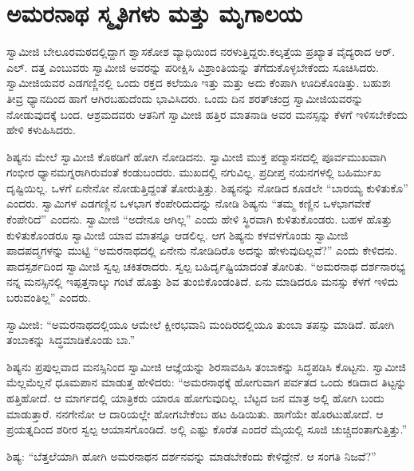 
\chapter{ಅಮರನಾಥ ಸ್ಮೃತಿಗಳು ಮತ್ತು ಮೃಗಾಲಯ }

 ಸ್ವಾಮೀಜಿ ಬೇಲೂರಮಠದಲ್ಲಿದ್ದಾಗ ಶ್ವಾಸಕೋಶ ವ್ಯಾಧಿಯಿಂದ ನರಳುತ್ತಿದ್ದರು.\break ಕಲ್ಕತ್ತೆಯ ಪ್ರಖ್ಯಾತ ವೈದ್ಯರಾದ ಆರ್. ಎಲ್. ದತ್ತ ಎಂಬುವರು ಸ್ವಾಮೀಜಿ ಅವರನ್ನು ಪರೀಕ್ಷಿಸಿ ವಿಶ್ರಾಂತಿಯನ್ನು ತೆಗೆದುಕೊಳ್ಳಬೇಕೆಂದು ಸೂಚಿಸಿದರು. ಸ್ವಾಮೀಜಿಯವರ ಎಡಗಣ್ಣಿನಲ್ಲಿ ಒಂದು ರಕ್ತದ ಕಲೆಯೂ ಇತ್ತು ಮತ್ತು ಅದು ಕೆಂಪಾಗಿ ಊದಿಕೊಂಡಿತ್ತು. ಬಹುಶಃ ತೀವ್ರ ಧ್ಯಾನದಿಂದ ಹಾಗೆ ಆಗಿರಬಹುದೆಂದು ಭಾವಿಸಿದರು. ಒಂದು ದಿನ ಶರತ್‍ಚಂದ್ರ ಸ್ವಾಮೀಜಿಯವರನ್ನು ನೋಡುವುದಕ್ಕೆ ಬಂದ. ಆಶ್ರಮದವರು ಆತನಿಗೆ ಸ್ವಾಮೀಜಿ ಹತ್ತಿರ ಮಾತನಾಡಿ ಅವರ ಮನಸ್ಸನ್ನು ಕೆಳಗೆ ಇಳಿಸಬೇಕೆಂದು ಹೇಳಿ ಕಳುಹಿಸಿದರು. 

\vskip 1pt

 ಶಿಷ್ಯನು ಮೇಲೆ ಸ್ವಾಮೀಜಿ ಕೊಠಡಿಗೆ ಹೋಗಿ ನೋಡಿದನು. ಸ್ವಾಮೀಜಿ ಮುಕ್ತ ಪದ್ಮಾಸನದಲ್ಲಿ ಪೂರ್ವಮುಖವಾಗಿ ಗಂಭೀರ ಧ್ಯಾನಮಗ್ನರಾಗಿರುವಂತೆ ಕಂಡುಬಂದರು. ಮುಖದಲ್ಲಿ ನಗುವಿಲ್ಲ. ಪ್ರದೀಪ್ತ ನಯನಗಳಲ್ಲಿ ಬಹಿರ್ಮುಖ ದೃಷ್ಟಿಯಿಲ್ಲ. ಒಳಗೆ ಏನೇನೋ ನೋಡುತ್ತಿದ್ದಂತೆ ತೋರುತ್ತಿತ್ತು. ಶಿಷ್ಯನನ್ನು ನೋಡಿದ ಕೂಡಲೇ “ಬಾರಯ್ಯ ಕುಳಿತುಕೊ” ಎಂದರು. ಸ್ವಾಮಿಗಳ ಎಡಗಣ್ಣಿನ ಒಳಭಾಗ ಕೆಂಪೇರಿದುದನ್ನು ನೋಡಿ ಶಿಷ್ಯನು “ತಮ್ಮ ಕಣ್ಣಿನ ಒಳಭಾಗವೇಕೆ ಕೆಂಪೇರಿದೆ” ಎಂದನು. ಸ್ವಾಮೀಜಿ “ಅದೇನೂ ಆಗಿಲ್ಲ” ಎಂದು ಹೇಳಿ ಸ್ಥಿರವಾಗಿ ಕುಳಿತುಕೊಂಡರು. ಬಹಳ ಹೊತ್ತು ಕುಳಿತುಕೊಂಡರೂ ಸ್ವಾಮೀಜಿ ಯಾವ ಮಾತನ್ನೂ ಆಡಲಿಲ್ಲ. ಆಗ ಶಿಷ್ಯನು ಕಳವಳಗೊಂಡು ಸ್ವಾಮೀಜಿ ಪಾದಪದ್ಮಗಳನ್ನು ಮುಟ್ಟಿ “ಅಮರನಾಥದಲ್ಲಿ ಏನೇನು ನೋಡಿದಿರೊ ಅದನ್ನು ಹೇಳುವುದಿಲ್ಲವೆ?” ಎಂದು ಕೇಳಿದನು. ಪಾದಸ್ಪರ್ಶದಿಂದ ಸ್ವಾಮೀಜಿ ಸ್ವಲ್ಪ ಚಕಿತರಾದರು. ಸ್ವಲ್ಪ ಬಹಿರ್ದೃಷ್ಟಿಯಾದಂತೆ ತೋರಿತು. “ಅಮರನಾಥ ದರ್ಶನಾರಭ್ಯ ನನ್ನ ಮನಸ್ಸಿನಲ್ಲಿ ಇಪ್ಪತ್ತನಾಲ್ಕು ಗಂಟೆ ಹೊತ್ತು ಶಿವ ತುಂಬಿಕೊಂಡಂತಿದೆ. ಏನು ಮಾಡಿದರೂ ಮನಸ್ಸು ಕೆಳಗೆ ಇಳಿದು ಬರುವಂತಿಲ್ಲ” ಎಂದರು. 

\vskip 1pt

 ಸ್ವಾಮೀಜಿ: “ಅಮರನಾಥದಲ್ಲಿಯೂ ಆಮೇಲೆ ಕ್ಷೀರಭವಾನಿ ಮಂದಿರದಲ್ಲಿಯೂ ತುಂಬಾ ತಪಸ್ಸು ಮಾಡಿದೆ. ಹೋಗಿ ತಂಬಾಕನ್ನು ಸಿದ್ಧಮಾಡಿಕೊಂಡು ಬಾ.” 

\vskip 1pt

 ಶಿಷ್ಯನು ಪ್ರಪುಲ್ಲವಾದ ಮನಸ್ಸಿನಿಂದ ಸ್ವಾಮೀಜಿ ಆಜ್ಞೆಯನ್ನು ಶಿರಸಾವಹಿಸಿ ತಂಬಾಕನ್ನು ಸಿದ್ಧಪಡಿಸಿ ಕೊಟ್ಟನು. ಸ್ವಾಮೀಜಿ ಮೆಲ್ಲಮೆಲ್ಲನೆ ಧೂಮಪಾನ ಮಾಡುತ್ತ ಹೇಳಿದರು: “ಅಮರನಾಥಕ್ಕೆ ಹೋಗುವಾಗ ಪರ್ವತದ ಒಂದು ಕಡಿದಾದ ತಿಟ್ಟನ್ನು ಹತ್ತಿಹೋದೆ. ಆ ಮಾರ್ಗದಲ್ಲಿ ಯಾತ್ರಿಕರು ಯಾರೂ ಹೋಗುವುದಿಲ್ಲ. ಬೆಟ್ಟದ ಜನ ಮಾತ್ರ ಅಲ್ಲಿ ಹೋಗಿ ಬಂದು ಮಾಡುತ್ತಾರೆ. ನನಗೇನೋ ಆ ದಾರಿಯಲ್ಲೇ ಹೋಗಬೇಕೆಂಬ ಹಟ ಹಿಡಿಯಿತು. ಹಾಗೆಯೇ ಹೊರಟುಹೋದೆ. ಆ ಪ್ರಯತ್ನದಿಂದ ಶರೀರ ಸ್ವಲ್ಪ ಆಯಾಸಗೊಂಡಿದೆ. ಅಲ್ಲಿ ಎಷ್ಟು ಕೊರೆತ ಎಂದರೆ ಮೈಯಲ್ಲಿ ಸೂಜಿ ಚುಚ್ಚಿದಂತಾಗುತ್ತಿತ್ತು.” 

\vskip 1pt

 ಶಿಷ್ಯ: “ಬೆತ್ತಲೆಯಾಗಿ ಹೋಗಿ ಅಮರನಾಥನ ದರ್ಶನವನ್ನು ಮಾಡಬೇಕೆಂದು ಕೇಳಿದ್ದೇನೆ. ಆ ಸಂಗತಿ ನಿಜವೆ?” 

\vskip 1pt

